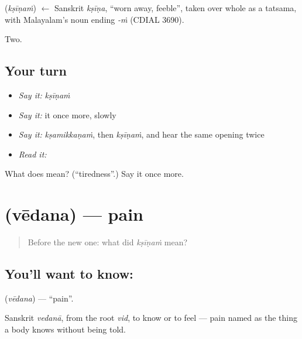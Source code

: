 \begin{cousinweb}
\textbf{} (\emph{kṣīṇaṁ}) $\leftarrow$ Sanskrit \emph{kṣīṇa}, \textquotedblleft{}worn away, feeble\textquotedblright{}, taken over whole as a tatsama, with Malayalam's noun ending \emph{-ṁ} (CDIAL 3690).
\end{cousinweb}

\begin{grammarlens}[title={What you've built}]
Two.
\end{grammarlens}

\subsection*{Your turn}
\begin{itemize}
\raggedright
  \item \emph{Say it:} \emph{kṣīṇaṁ}
  \item \emph{Say it:} it once more, slowly
  \item \emph{Say it:} \emph{kṣamikkaṇaṁ}, then \emph{kṣīṇaṁ}, and hear the same opening twice
  \item \emph{Read it:} \textbf{}
\end{itemize}

\begin{tcolorbox}[breakable,colback=teal!4,colframe=teal!35!black,title={Before you move on}]
What does  mean? (\textquotedblleft{}tiredness\textquotedblright{}.) Say it once more.
\end{tcolorbox}
\section[\texorpdfstring{\ml{വേദന} (vēdana)}{വേദന (vēdana)}]{ (vēdana) — pain}

\label{lesson:ML-C63-pain}



\begin{quote}
Before the new one: what did \emph{kṣīṇaṁ} mean?
\end{quote}

\subsection*{You'll want to know: }
\textbf{} (\emph{vēdana}) — \textquotedblleft{}pain\textquotedblright{}.

Sanskrit \emph{vedanā}, from the root \emph{vid}, to know or to feel — pain named as the thing a body knows without being told.

